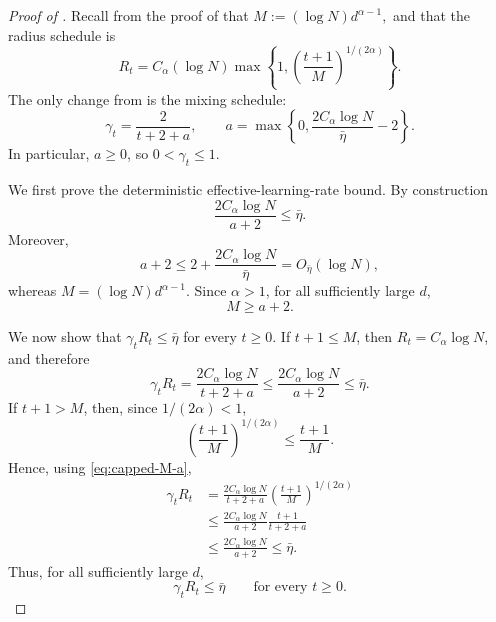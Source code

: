 \documentclass[11pt]{article}
\theoremstyle{definition}
\begin{document}
\begin{proof}[Proof of ]
Recall from the proof of  that $M:=(\log N)d^{\alpha-1},$
and that the radius schedule is
\[
R_t
=
C_\alpha(\log N)
\max\left\{
1,
\left(\frac{t+1}{M}\right)^{1/(2\alpha)}
\right\}.
\]
The only change from  is the mixing schedule:
\[
\gamma_t=\frac{2}{t+2+a},
\qquad
a=
\max\left\{
0,\frac{2C_\alpha\log N}{\bar\eta}-2
\right\}.
\]
In particular, \(a\ge0\), so \(0<\gamma_t\le1\).

We first prove the deterministic effective-learning-rate bound. By construction
\begin{equation}
\frac{2C_\alpha\log N}{a+2}\le\bar\eta.
\label{eq:capped-a-choice}
\end{equation}
Moreover,
\[
a+2
\le
2+\frac{2C_\alpha\log N}{\bar\eta}
=
O_{\bar\eta}(\log N),
\]
whereas \(M=(\log N)d^{\alpha-1}\).  Since \(\alpha>1\), for all
sufficiently large \(d\),
\begin{equation}
M\ge a+2.
\label{eq:capped-M-a}
\end{equation}

We now show that \(\gamma_tR_t\le\bar\eta\) for every \(t\ge0\).
If \(t+1\le M\), then \(R_t=C_\alpha\log N\), and therefore
\[
\gamma_tR_t
=
\frac{2C_\alpha\log N}{t+2+a}
\le
\frac{2C_\alpha\log N}{a+2}
\le
\bar\eta.
\]
If \(t+1>M\), then, since \(1/(2\alpha)<1\),
\[
\left(\frac{t+1}{M}\right)^{1/(2\alpha)}
\le
\frac{t+1}{M}.
\]
Hence, using \eqref{eq:capped-M-a},
\begin{align*}
\gamma_tR_t
&=
\frac{2C_\alpha\log N}{t+2+a}
\left(\frac{t+1}{M}\right)^{1/(2\alpha)}\\
&\le
\frac{2C_\alpha\log N}{a+2}
\frac{t+1}{t+2+a}\\
&\le
\frac{2C_\alpha\log N}{a+2}
\le
\bar\eta.
\end{align*}
Thus, for all sufficiently large \(d\),
\begin{equation}
\gamma_tR_t\le\bar\eta
\qquad\text{for every }t\ge0.
\label{eq:capped-effective}
\end{equation}


\end{proof}
\end{document}
